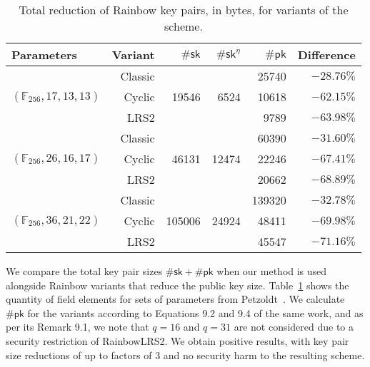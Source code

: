 \documentclass[12pt, a4paper, oneside]{memoir}
\theoremstyle{definition}
\begin{document}
\begin{table}[htbp]
  \renewcommand{\arraystretch}{1.2}
  \centering
  \caption{Total reduction of Rainbow key pairs, in bytes, for variants of the scheme.}\label{tab:2}
  \begin{tabular}{l*{5}{r}}
    \toprule
    Parameters & Variant & $\#\mathsf{sk}$ & $\#\mathsf{sk}^{\eta}$ & $\#\mathsf{pk}$ & Difference \\ \midrule
    \multirow{3}{*}{$(\mathbb{F}_{256}, 17, 13, 13)$}  &  Classic &  \multirow{3}{*}{ 19546} &  \multirow{3}{*}{ 6524} &   25740 & $-28.76\%$ \\
                                                       &   Cyclic &                          &                         &   10618 & $-62.15\%$ \\
                                                       &     LRS2 &                          &                         &    9789 & $-63.98\%$ \\
    \multirow{3}{*}{$(\mathbb{F}_{256}, 26, 16, 17)$}  &  Classic &  \multirow{3}{*}{ 46131} &  \multirow{3}{*}{12474} &   60390 & $-31.60\%$ \\
                                                       &   Cyclic &                          &                         &   22246 & $-67.41\%$ \\
                                                       &     LRS2 &                          &                         &   20662 & $-68.89\%$ \\
    \multirow{3}{*}{$(\mathbb{F}_{256}, 36, 21, 22)$}  &  Classic &  \multirow{3}{*}{105006} &  \multirow{3}{*}{24924} &  139320 & $-32.78\%$ \\
                                                       &   Cyclic &                          &                         &   48411 & $-69.98\%$ \\
                                                       &     LRS2 &                          &                         &   45547 & $-71.16\%$ \\
    \bottomrule
  \end{tabular}
\end{table}

We compare the total key pair sizes $\#\mathsf{sk} + \#\mathsf{pk}$
when our method is used alongside Rainbow variants that reduce the public key
size. Table~\ref{tab:2} shows the quantity of field elements for sets of
parameters from Petzoldt~\cite[Table 9.8]{Petzoldt:201307}. We calculate
$\#\mathsf{pk}$ for the variants according to Equations 9.2 and 9.4 of the
same work, and as per its Remark 9.1, we note that $q = 16$ and $q = 31$ are not
considered due to a security restriction of RainbowLRS2. We obtain positive
results, with key pair size reductions of up to factors of 3 and no security
harm to the resulting scheme.
\end{document}
